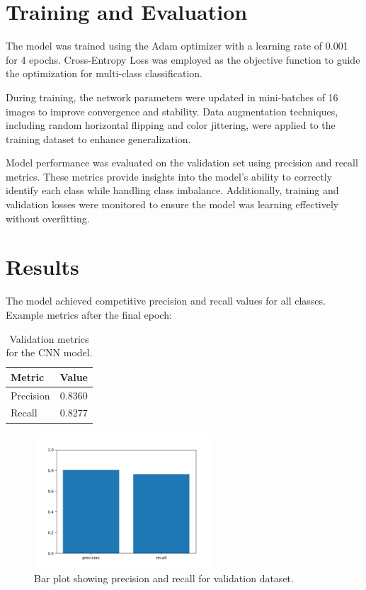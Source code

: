 \documentclass[11pt]{article}
\begin{document}
\section{Training and Evaluation}
The model was trained using the Adam optimizer with a learning rate of 0.001 for 4 epochs. Cross-Entropy Loss was employed as the objective function to guide the optimization for multi-class classification.

During training, the network parameters were updated in mini-batches of 16 images to improve convergence and stability. Data augmentation techniques, including random horizontal flipping and color jittering, were applied to the training dataset to enhance generalization.

Model performance was evaluated on the validation set using precision and recall metrics. These metrics provide insights into the model's ability to correctly identify each class while handling class imbalance. Additionally, training and validation losses were monitored to ensure the model was learning effectively without overfitting.

\section{Results}
The model achieved competitive precision and recall values for all classes. Example metrics after the final epoch:

\begin{table}[H]
\centering
\begin{tabular}{lc}
\toprule
Metric & Value \\
\midrule
Precision & 0.8360 \\
Recall & 0.8277 \\
\bottomrule
\end{tabular}
\caption{Validation metrics for the CNN model.}
\end{table}

\begin{figure}[H]
\centering
\includegraphics[width=0.6\textwidth]{Figure_7.png}
\caption{Bar plot showing precision and recall for validation dataset.}
\end{figure}
\end{document}

